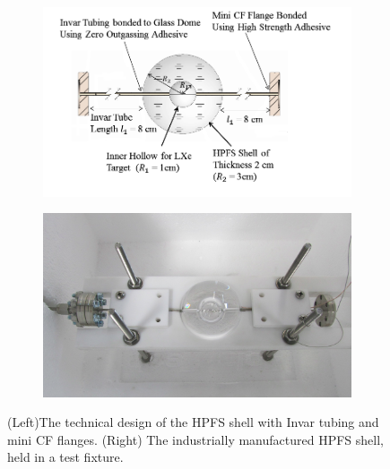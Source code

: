 \begin{figure}[h]
\centering
\begin{subfigure}[c]{0.4\textheight}
\includegraphics[width=\textwidth]{spheredesign1.png}
\end{subfigure}
\begin{subfigure}[c]{0.25\textheight}
\includegraphics[width=\textwidth]{spherephoto.png}
\end{subfigure}
\caption{(Left)The technical design of the HPFS shell with Invar tubing and mini CF flanges. 
(Right) The industrially manufactured HPFS shell, held in a test fixture.} 
\label{fig:sphere}
\end{figure}




